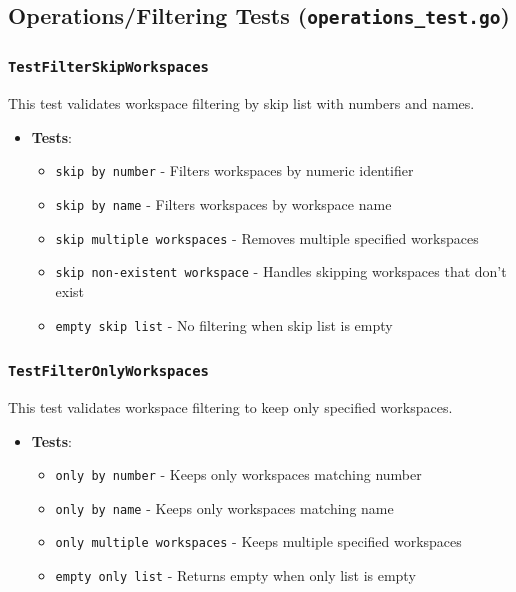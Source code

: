 \subsection{Operations/Filtering Tests (\texttt{operations\_test.go})}

\subsubsection*{\texttt{TestFilterSkipWorkspaces}}
This test validates workspace filtering by skip list with numbers and names.
\begin{itemize}
    \item \textbf{Tests}:
    \begin{itemize}
        \item \texttt{skip by number} - Filters workspaces by numeric identifier
        \item \texttt{skip by name} - Filters workspaces by workspace name
        \item \texttt{skip multiple workspaces} - Removes multiple specified workspaces
        \item \texttt{skip non-existent workspace} - Handles skipping workspaces that don't exist
        \item \texttt{empty skip list} - No filtering when skip list is empty
    \end{itemize}
\end{itemize}

\subsubsection*{\texttt{TestFilterOnlyWorkspaces}}
This test validates workspace filtering to keep only specified workspaces.
\begin{itemize}
    \item \textbf{Tests}:
    \begin{itemize}
        \item \texttt{only by number} - Keeps only workspaces matching number
        \item \texttt{only by name} - Keeps only workspaces matching name
        \item \texttt{only multiple workspaces} - Keeps multiple specified workspaces
        \item \texttt{empty only list} - Returns empty when only list is empty
    \end{itemize}
\end{itemize}

